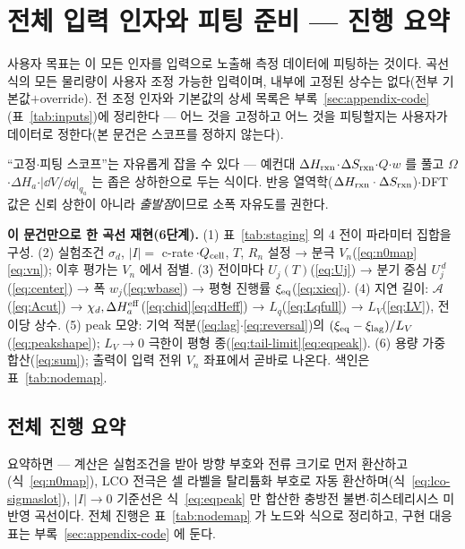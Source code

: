 \section{전체 입력 인자와 피팅 준비 --- 진행 요약}\label{sec:inputs}
사용자 목표는 이 모든 인자를 입력으로 노출해 측정 데이터에 피팅하는 것이다. 곡선식의 모든 물리량이 사용자
조정 가능한 입력이며, 내부에 고정된 상수는 없다(전부 기본값$+$override). 전 조정 인자와 기본값의 상세
목록은 부록~\ref{sec:appendix-code}(표~\ref{tab:inputs})에 정리한다 --- 어느 것을 고정하고 어느 것을
피팅할지는 사용자가 데이터로 정한다(본 문건은 스코프를 정하지 않는다).

``고정$\cdot$피팅 스코프''는 자유롭게 잡을 수 있다 --- 예컨대
$\Delta H_{\mathrm{rxn}}$$\cdot$$\Delta S_{\mathrm{rxn}}$$\cdot$$Q$$\cdot$$w$ 를 풀고 $\Omega$$\cdot$$\Delta H_a$$\cdot$$|\dd V/\dd q|_{q_a}$
는 좁은 상하한으로 두는 식이다. 반응 열역학($\Delta H_{\mathrm{rxn}}\cdot\Delta S_{\mathrm{rxn}}$)$\cdot$DFT 값은 신뢰 상한이 아니라
\emph{출발점}이므로 소폭 자유도를 권한다.

\begin{keybox}
\textbf{이 문건만으로 한 곡선 재현(6단계).}
(1) 표~\ref{tab:staging} 의 4 전이 파라미터 집합을 구성.
(2) 실험조건 $\sigma_d$, $|I|=$ c-rate$\,\cdot Q_{\mathrm{cell}}$, $T$, $R_n$ 설정 → 분극 $V_n$(\eqref{eq:n0map}\eqref{eq:vn}); 이후 평가는 $V_n$ 에서 점별.
(3) 전이마다 $U_j(T)$(\eqref{eq:Uj}) → 분기 중심 $U_j^{\,d}$(\eqref{eq:center}) → 폭 $w_j$(\eqref{eq:wbase}) → 평형 진행률 $\xi_{\mathrm{eq}}$(\eqref{eq:xieq}).
(4) 지연 길이: $\mathcal A$(\eqref{eq:Acut}) → $\chi_d,\Delta H_a^{\mathrm{eff}}$(\eqref{eq:chid}\eqref{eq:dHeff}) → $L_q$(\eqref{eq:Lqfull}) → $L_V$(\eqref{eq:LV}), 전이당 상수.
(5) peak 모양: 기억 적분(\eqref{eq:lag}$\cdot$\eqref{eq:reversal})의 $(\xi_{\mathrm{eq}}-\xi_\mathrm{lag})/L_V$(\eqref{eq:peakshape}); $L_V\to0$ 극한이 평형 종(\eqref{eq:tail-limit}\eqref{eq:eqpeak}).
(6) 용량 가중 합산(\eqref{eq:sum}); 출력이 입력 전위 $V_n$ 좌표에서 곧바로 나온다. 색인은 표~\ref{tab:nodemap}.
\end{keybox}

\subsection{전체 진행 요약}\label{sec:facade}
요약하면 --- 계산은 실험조건을 받아 방향 부호와 전류 크기로 먼저 환산하고(식~\eqref{eq:n0map}),
LCO 전극은 셀 라벨을 탈리튬화 부호로 자동 환산하며(식~\eqref{eq:lco-sigmaslot}), $|I|\to0$ 기준선은
식~\eqref{eq:eqpeak} 만 합산한 충방전 불변$\cdot$히스테리시스 미반영 곡선이다. 전체 진행은
표~\ref{tab:nodemap} 가 노드와 식으로 정리하고, 구현 대응표는
부록~\ref{sec:appendix-code} 에 둔다.

